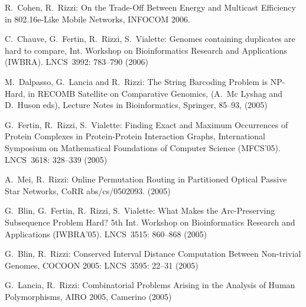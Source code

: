 \begin{etaremune}
\vspace{-1.8mm}
  \item {\sc R.~Cohen, R.~Rizzi:}
   \newblock   On the Trade-Off Between Energy and Multicast Efficiency in 802.16e-Like Mobile Networks,
   \newblock INFOCOM 2006.

\vspace{-1.8mm}
  \item {C.~Chauve, G.~Fertin, R.~Rizzi, S.~Vialette:}
   \newblock Genomes containing duplicates are hard to compare,
   \newblock Int. Workshop on Bioinformatics Research and Applications (IWBRA).
   \newblock LNCS~3992: 783--790 (2006)

\vspace{-1.8mm}
  \item {M.~Dalpasso, G.~Lancia and R.~Rizzi:}
   \newblock The String Barcoding Problem is NP-Hard,
   \newblock in RECOMB Satellite on Comparative Genomics, (A.~Mc Lyshag and D.~Huson eds),
   \newblock Lecture Notes in Bioinformatics, Springer, 85--93, (2005) 

\vspace{-1.8mm}
  \item {G.~Fertin, R.~Rizzi, S.~Vialette:}
   \newblock Finding Exact and Maximum Occurrences
of Protein Complexes in Protein-Protein Interaction Graphs,
   \newblock International Symposium on Mathematical Foundations of Computer Science (MFCS'05).
   \newblock LNCS~3618: 328--339 (2005)

\vspace{-1.8mm}
  \item {A.~Mei, R.~Rizzi:}
   \newblock Online Permutation Routing in Partitioned Optical Passive Star Networks,
   \newblock CoRR abs/cs/0502093. (2005)

\vspace{-1.8mm}
  \item {G.~Blin, G.~Fertin, R.~Rizzi, S.~Vialette:}
   \newblock What Makes the Arc-Preserving Subsequence Problem Hard?
   \newblock 5th Int. Workshop on Bioinformatics Research and Applications (IWBRA'05).
   \newblock  LNCS~3515: 860--868 (2005)

\vspace{-1.8mm}
  \item {G.~Blin, R.~Rizzi:}
   \newblock Conserved Interval Distance Computation Between Non-trivial Genomes,
   \newblock COCOON 2005:
   \newblock  LNCS~3595: 22--31 (2005)

\vspace{-1.8mm}
  \item {G.~Lancia, R.~Rizzi:}
   \newblock Combinatorial Problems Arising in the Analysis of Human Polymorphisms,
   \newblock AIRO 2005, Camerino (2005)


\end{etaremune}
